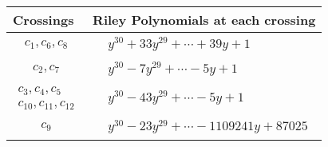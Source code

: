 \documentclass[1p]{elsarticle_modified}
\theoremstyle{definition}
\begin{document}
\begin{tabular}{m{50pt}|m{274pt}}
Crossings & \hspace{64pt}Riley Polynomials at each crossing \\
\hline $$\begin{aligned}c_{1},c_{6},c_{8}\end{aligned}$$&$\begin{aligned}
&y^{30}+33 y^{29}+\cdots+39 y+1
\end{aligned}$\\
\hline $$\begin{aligned}c_{2},c_{7}\end{aligned}$$&$\begin{aligned}
&y^{30}-7 y^{29}+\cdots-5 y+1
\end{aligned}$\\
\hline $$\begin{aligned}c_{3},c_{4},c_{5}\\c_{10},c_{11},c_{12}\end{aligned}$$&$\begin{aligned}
&y^{30}-43 y^{29}+\cdots-5 y+1
\end{aligned}$\\
\hline $$\begin{aligned}c_{9}\end{aligned}$$&$\begin{aligned}
&y^{30}-23 y^{29}+\cdots-1109241 y+87025
\end{aligned}$\\
\hline
\end{tabular}
\vskip 2pc
\end{document}
